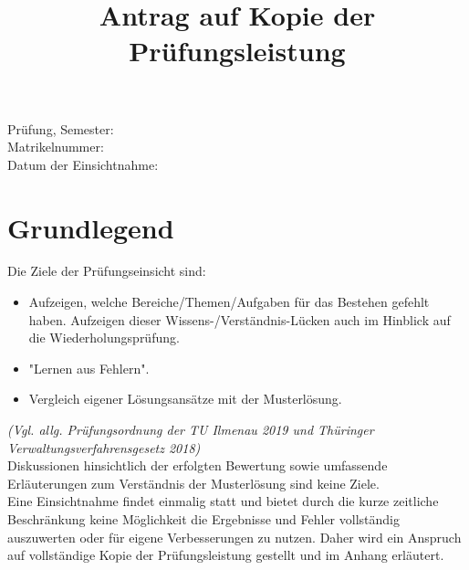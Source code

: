 \documentclass[12pt, a4paper]{article}
\title{Antrag auf Kopie der Prüfungsleistung}
\author{}
\date{}
\begin{document}
\maketitle

\begin{Form}
    \centering
    \noindent Prüfung, Semester: \TextField[name=Prüfung,width=8cm, charsize=10pt, bordercolor={0 1 1}, value={}] {\mbox{}}\\
    \vspace{0.5cm}
    \noindent Matrikelnummer: \TextField[name=Matrikelnummer,width=8.4cm, charsize=10pt, bordercolor={0 1 1}, value={}] {\mbox{}}\\
    \vspace{0.5cm}
    \noindent Datum der Einsichtnahme: \TextField[name=Matrikelnummer,width=6.6cm, charsize=10pt, bordercolor={0 1 1}, value={}] {\mbox{}}\\
    \vspace{0.5cm}
\end{Form}

\section{Grundlegend}
Die Ziele der Prüfungseinsicht sind:
\begin{itemize}
    \item Aufzeigen, welche Bereiche/Themen/Aufgaben für das Bestehen gefehlt haben. Aufzeigen dieser Wissens-/Verständnis-Lücken auch im Hinblick auf die Wiederholungsprüfung.
    \item "Lernen aus Fehlern".
    \item Vergleich eigener Lösungsansätze mit der Musterlösung.
\end{itemize}
\textit{\scriptsize(Vgl. allg. Prüfungsordnung der TU Ilmenau 2019 und Thüringer Verwaltungsverfahrensgesetz 2018)}\\
Diskussionen hinsichtlich der erfolgten Bewertung sowie umfassende Erläuterungen zum Verständnis der Musterlösung sind keine Ziele. \\
Eine Einsichtnahme findet einmalig statt und bietet durch die kurze zeitliche Beschränkung keine Möglichkeit die Ergebnisse und Fehler vollständig auszuwerten oder für eigene Verbesserungen zu nutzen. Daher wird ein Anspruch auf vollständige Kopie der Prüfungsleistung gestellt und im Anhang erläutert.

\vspace{2cm}
\end{document}
